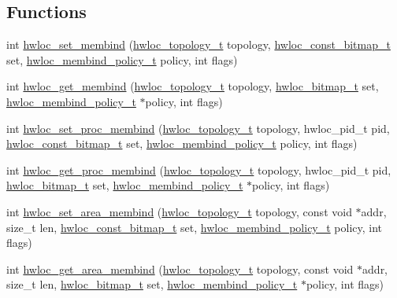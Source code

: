 \subsection*{Functions}
\begin{DoxyCompactItemize}
\item 
int \hyperlink{a00191_ga020951efa0ce3862bd4faec295501a7f}{hwloc\+\_\+set\+\_\+membind} (\hyperlink{a00186_ga9d1e76ee15a7dee158b786c30b6a6e38}{hwloc\+\_\+topology\+\_\+t} topology, \hyperlink{a00205_gae991a108af01d408be2776c5b2c467b2}{hwloc\+\_\+const\+\_\+bitmap\+\_\+t} set, \hyperlink{a00191_gac9764f79505775d06407b40f5e4661e8}{hwloc\+\_\+membind\+\_\+policy\+\_\+t} policy, int flags)
\item 
int \hyperlink{a00191_gae21f0a1a884929c784bebf070252aa56}{hwloc\+\_\+get\+\_\+membind} (\hyperlink{a00186_ga9d1e76ee15a7dee158b786c30b6a6e38}{hwloc\+\_\+topology\+\_\+t} topology, \hyperlink{a00205_gaa3c2bf4c776d603dcebbb61b0c923d84}{hwloc\+\_\+bitmap\+\_\+t} set, \hyperlink{a00191_gac9764f79505775d06407b40f5e4661e8}{hwloc\+\_\+membind\+\_\+policy\+\_\+t} $\ast$policy, int flags)
\item 
int \hyperlink{a00191_gabc91ff16f7e41047924e3a4ae6d9da7e}{hwloc\+\_\+set\+\_\+proc\+\_\+membind} (\hyperlink{a00186_ga9d1e76ee15a7dee158b786c30b6a6e38}{hwloc\+\_\+topology\+\_\+t} topology, hwloc\+\_\+pid\+\_\+t pid, \hyperlink{a00205_gae991a108af01d408be2776c5b2c467b2}{hwloc\+\_\+const\+\_\+bitmap\+\_\+t} set, \hyperlink{a00191_gac9764f79505775d06407b40f5e4661e8}{hwloc\+\_\+membind\+\_\+policy\+\_\+t} policy, int flags)
\item 
int \hyperlink{a00191_ga1730ceb18ec6ee3b7bd3d0db81f07dc8}{hwloc\+\_\+get\+\_\+proc\+\_\+membind} (\hyperlink{a00186_ga9d1e76ee15a7dee158b786c30b6a6e38}{hwloc\+\_\+topology\+\_\+t} topology, hwloc\+\_\+pid\+\_\+t pid, \hyperlink{a00205_gaa3c2bf4c776d603dcebbb61b0c923d84}{hwloc\+\_\+bitmap\+\_\+t} set, \hyperlink{a00191_gac9764f79505775d06407b40f5e4661e8}{hwloc\+\_\+membind\+\_\+policy\+\_\+t} $\ast$policy, int flags)
\item 
int \hyperlink{a00191_gaf881faefe20701229f07dd7dbd0125ed}{hwloc\+\_\+set\+\_\+area\+\_\+membind} (\hyperlink{a00186_ga9d1e76ee15a7dee158b786c30b6a6e38}{hwloc\+\_\+topology\+\_\+t} topology, const void $\ast$addr, size\+\_\+t len, \hyperlink{a00205_gae991a108af01d408be2776c5b2c467b2}{hwloc\+\_\+const\+\_\+bitmap\+\_\+t} set, \hyperlink{a00191_gac9764f79505775d06407b40f5e4661e8}{hwloc\+\_\+membind\+\_\+policy\+\_\+t} policy, int flags)
\item 
int \hyperlink{a00191_gaa87e0a6946ff145914fdf0b1c60567f8}{hwloc\+\_\+get\+\_\+area\+\_\+membind} (\hyperlink{a00186_ga9d1e76ee15a7dee158b786c30b6a6e38}{hwloc\+\_\+topology\+\_\+t} topology, const void $\ast$addr, size\+\_\+t len, \hyperlink{a00205_gaa3c2bf4c776d603dcebbb61b0c923d84}{hwloc\+\_\+bitmap\+\_\+t} set, \hyperlink{a00191_gac9764f79505775d06407b40f5e4661e8}{hwloc\+\_\+membind\+\_\+policy\+\_\+t} $\ast$policy, int flags)

\end{DoxyCompactItemize}

